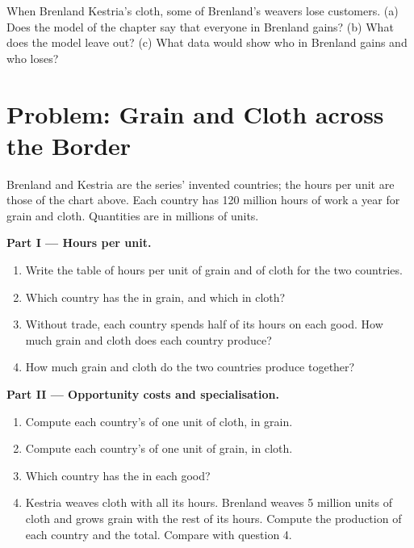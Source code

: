 \begin{exercise}[$\star\star\star$]\label{exo:g7:comparative-advantage:12}
When Brenland  Kestria's cloth, some of Brenland's weavers lose customers.
(a) Does the model of the chapter say that everyone in Brenland gains? (b) What does the
model leave out? (c) What data would show who in Brenland gains and who loses?
\end{exercise}

\section{Problem: Grain and Cloth across the Border}

\begin{problem}
\label{pb:g7:comparative-advantage:1}
Brenland and Kestria are the series' invented countries; the hours per unit are those of
the chart above. Each country has 120 million hours of work a year for grain and cloth.
Quantities are in millions of units.

\medskip
\noindent\textbf{Part I --- Hours per unit.}
\begin{enumerate}
  \item Write the table of hours per unit of grain and of cloth for the two countries.
  \item Which country has the  in grain, and which in cloth?
  \item Without trade, each country spends half of its hours on each good. How much grain
        and cloth does each country produce?
  \item How much grain and cloth do the two countries produce together?
\end{enumerate}

\medskip
\noindent\textbf{Part II --- Opportunity costs and specialisation.}
\begin{enumerate}[resume]
  \item Compute each country's  of one unit of cloth, in grain.
  \item Compute each country's  of one unit of grain, in cloth.
  \item Which country has the  in each good?
  \item Kestria weaves cloth with all its hours. Brenland weaves 5 million units of cloth
        and grows grain with the rest of its hours. Compute the production of each country
        and the total. Compare with question 4.
\end{enumerate}


\end{problem}
